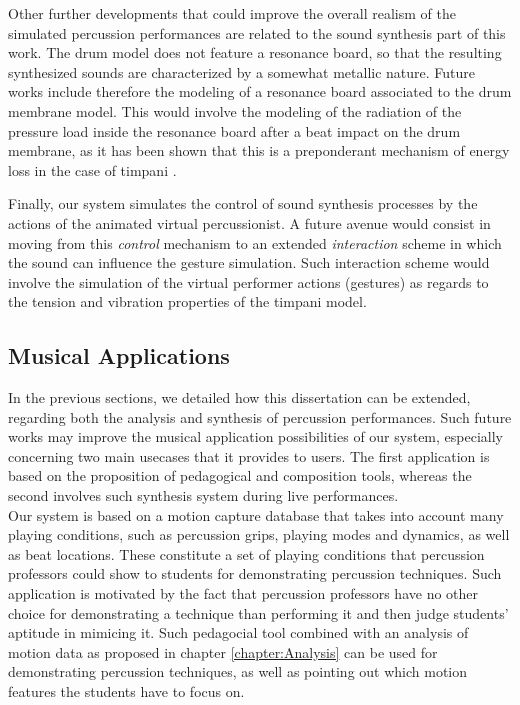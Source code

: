 Other further developments that could improve the overall realism of the simulated percussion performances are related to the sound synthesis part of this work. The drum model does not feature a resonance board, so that the resulting synthesized sounds are characterized by a somewhat metallic nature. Future works include therefore the modeling of a resonance board associated to the drum membrane model. This would involve the modeling of the radiation of the pressure load inside the resonance board after a beat impact on the drum membrane, as it has been shown that this is a preponderant mechanism of energy loss in the case of timpani .

Finally, our system simulates the control of sound synthesis processes by the actions of the animated virtual percussionist. A future avenue would consist in moving from this \emph{control} mechanism to an extended \emph{interaction} scheme in which the sound can influence the gesture simulation. Such interaction scheme would involve the simulation of the virtual performer actions (gestures) as regards to the tension and vibration properties of the timpani model.


		\subsection{Musical Applications}
		\label{subsec:Conclusion_FutureWork_MusicalApplications}

In the previous sections, we detailed how this dissertation can be extended, regarding both the analysis and synthesis of percussion performances. Such future works may improve the musical application possibilities of our system, especially concerning two main usecases that it provides to users. The first application is based on the proposition of pedagogical and composition tools, whereas the second involves such synthesis system during live performances.\\


Our system is based on a motion capture database that takes into account many playing conditions, such as percussion grips, playing modes and dynamics, as well as beat locations. These constitute a set of playing conditions that percussion professors could show to students for demonstrating percussion techniques. Such application is motivated by the fact that percussion professors have no other choice for demonstrating a technique than performing it and then judge students' aptitude in mimicing it. Such pedagocial tool combined with an analysis of motion data as proposed in chapter \ref{chapter:Analysis} can be used for demonstrating percussion techniques, as well as pointing out which motion features the students have to focus on.

